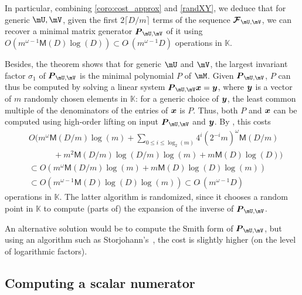 \documentclass[12pt]{article}
\newcommand{\mat}[1]{\bm{\MakeUppercase{#1}}} %
\newcommand{\col}[1]{\bm{\MakeLowercase{#1}}} %
\newcommand{\seq}{\mat{\mathcal{F}}} %
\newcommand{\softO}[1]{O{\tilde{~}}(#1)} %
\newcommand{\minpoly}{P}
\def\M {\ensuremath{\mathsf{M}}}
\def\K{\mathbb{K}}
\def\K {\ensuremath{\mathbb{K}}}
\begin{document}
In particular, combining \cref{coro:cost_approx} and \cref{randXY}, we
deduce that for generic $\mU,\mV$, given the first $2 \lceil D/m
\rceil$ terms of the sequence $\seq_{\mU,\mV}$, we can recover a
minimal matrix generator  $\mat{P}_{\mU,\mV}$ of it using $O(m^{\omega-1} \M(D) \log(D))
\subset \softO{m^{\omega-1} D}$ operations in $\K$.

Besides, the theorem shows that for generic $\mU$ and $\mV$, the
largest invariant factor $\sigma_1$ of $\mat{P}_{\mU,\mV}$ is the
minimal polynomial $\minpoly$ of $\mM$.  Given $\mat{P}_{\mU,\mV}$,
$\minpoly$ can thus be computed by solving a linear system
$\mat{P}_{\mU,\mV} \col{x} = \col{y}$, where $\col{y}$ is a vector of
$m$ randomly chosen elements in $\K$: for a generic choice of
$\col{y}$, the least common multiple of the denominators of the
entries of $\col{x}$ is $\minpoly$.  Thus, both $\minpoly$ and $\col{x}$
can be computed using
high-order lifting \cite[Algorithm~5]{Stor03} on input
$\mat{P}_{\mU,\mV}$ and $\col{y}$. By
\cite[Corollary~16]{Stor03}, this costs
\begin{align}
  & O\Bigg(m^{\omega} \M(D/m) \log(m) + \sum_{0 \le i \le \log_2(m)} 4^i (2^{-i}m)^\omega \M(D/m) \nonumber \\
  & \quad\qquad + m^2 \M(D/m)\log(D/m)\log(m) + m \M(D) \log(D) \Bigg) \nonumber \\
  & \subset O(m^\omega \M(D/m) \log(m) + m \M(D)\log(D)\log(m))  \nonumber \\
  & \subset O(m^{\omega-1} \M(D) \log(D)\log(m)) \subset \softO{m^{\omega-1}D}
  \label{eqn:hol_cost}
\end{align}
operations in $\K$.
The latter algorithm is randomized, since it chooses a random point in $\K$ to
compute (parts of) the expansion of the inverse of
$\mat{P}_{\mU,\mV}$.


An alternative solution would be to compute the Smith form of
$\mat{P}_{\mU,\mV}$, but using an algorithm such as
Storjohann's~\cite[Section~17]{Stor03}, the cost is slightly higher (on the
level of logarithmic factors).


\subsection{Computing a scalar numerator}\label{ssec:scalar_numer}
\end{document}
